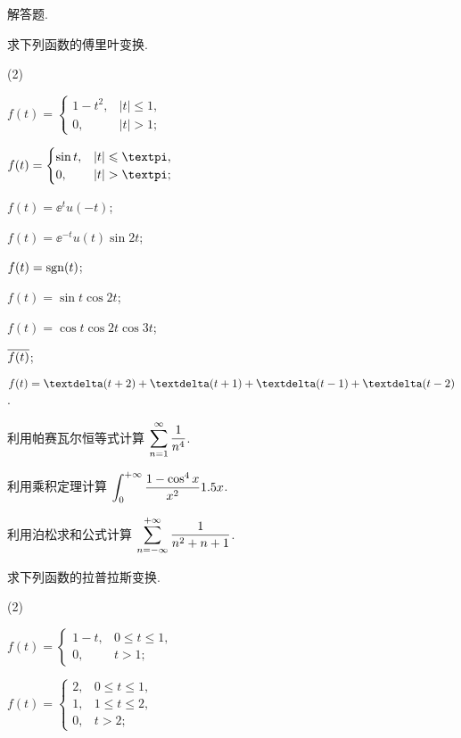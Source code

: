 \begin{homework}
  \item 解答题.
  \begin{homework}
    \item 求下列函数的傅里叶变换.
    \begin{subhomework}(2)
      \item $f(t)=\begin{cases}
        1-t^2,&|t|\le 1,\\
        0,&|t|>1;
      \end{cases}$
      \item $f(t)=\begin{cases}
        \sin t,&|t|\le \cpi,\\
        0,&|t|>\cpi;
      \end{cases}$
      \item $f(t)=\ee^tu(-t)$;
      \item $f(t)=\ee^{-t} u(t)\sin 2t$;
      \item $f(t)=\operatorname{sgn}(t)$;
      \item $f(t)=\sin t\cos 2t$;
      \item $f(t)=\cos t\cos 2t\cos 3t$;
      \item $\overline{f(t)}$;
      \item* $f(t)=\dirac(t+2)+\dirac(t+1)+\dirac(t-1)+\dirac(t-2)$.
    \end{subhomework}
    \item 利用帕赛瓦尔恒等式计算 $\displaystyle\sum_{n=1}^{\infty}\frac1{n^4}$.
    \item 利用乘积定理计算 $\displaystyle\int_0^{+\infty}\dfrac{1-\cos^4 x}{x^2}1.5 x$.
    \item 利用泊松求和公式计算 $\displaystyle\sum_{n=-\infty}^{+\infty} \dfrac1{n^2+n+1}$.
    \item 求下列函数的拉普拉斯变换.
    \begin{subhomework}(2)
      \item $f(t)=\begin{cases}
        1-t,&0\le t\le 1,\\
        0,& t>1;
      \end{cases}$
      \item $f(t)=\begin{cases}
        2,&0\le t\le 1,\\
        1,&1\le t\le 2,\\
        0,& t>2;
      \end{cases}$

\end{subhomework}
\end{homework}
\end{homework}
